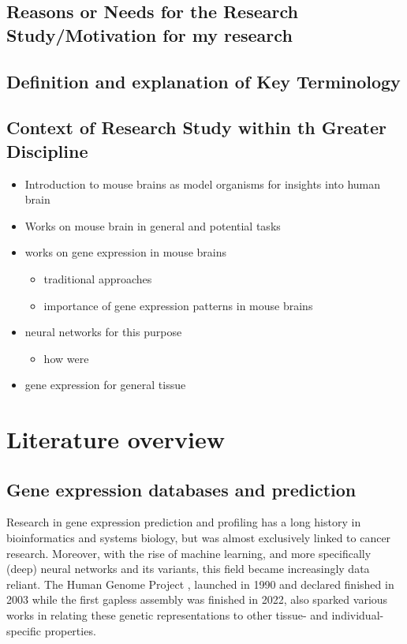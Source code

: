 \documentclass[]{article}
\renewcommand{\cite}{\citep}
\begin{document}
\subsection*{Reasons or Needs for the Research Study/Motivation for my research}

\subsection*{Definition and explanation of Key Terminology}

\subsection*{Context of Research Study within th Greater Discipline}

\begin{itemize}
	\item Introduction to mouse brains as model organisms for insights into human brain
	\item Works on mouse brain in general and potential tasks
	\item works on gene expression in mouse brains
	\begin{itemize}
		\item traditional approaches
		\item importance of gene expression patterns in mouse brains
	\end{itemize}
	\item neural networks for this purpose
	\begin{itemize}
		\item how were 
	\end{itemize}
	\item gene expression for general tissue
	
\end{itemize}

\newpage
\section{Literature overview}
\label{sec:relatedwork}
\subsection{Gene expression databases and prediction}
\label{sec:relatedwork_geneexp}
Research in gene expression prediction and profiling has a long history in bioinformatics and systems biology, but was almost exclusively linked to cancer research. Moreover, with the rise of machine learning, and more specifically (deep) neural networks and its variants, this field became increasingly data reliant. The Human Genome Project \cite{watson1990human}, launched in 1990 and declared finished in 2003 while the first gapless assembly was finished in 2022, also sparked various works in relating these genetic representations to other tissue- and individual-specific properties. 
\end{document}
